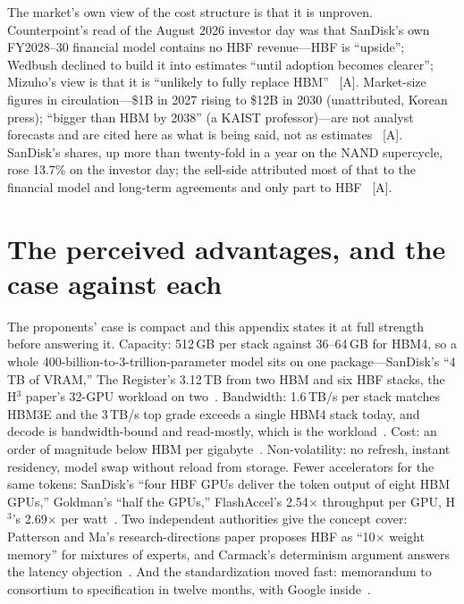 The market's own view of the cost structure is that it is unproven. Counterpoint's read of the August 2026 investor day was that SanDisk's own FY2028--30 financial model contains no HBF revenue---HBF is ``upside''; Wedbush declined to build it into estimates ``until adoption becomes clearer''; Mizuho's view is that it is ``unlikely to fully replace HBM''~\cite{hbf-counterpoint,hbf-tapeout} [A]. Market-size figures in circulation---\$1B in 2027 rising to \$12B in 2030 (unattributed, Korean press); ``bigger than HBM by 2038'' (a KAIST professor)---are not analyst forecasts and are cited here as what is being said, not as estimates~\cite{hbf-koreaherald,hbf-kaist} [A]. SanDisk's shares, up more than twenty-fold in a year on the NAND supercycle, rose 13.7\% on the investor day; the sell-side attributed most of that to the financial model and long-term agreements and only part to HBF~\cite{hbf-tapeout,hbf-counterpoint} [A].

\section{The perceived advantages, and the case against each}

The proponents' case is compact and this appendix states it at full strength before answering it. Capacity: 512\,GB per stack against 36--64\,GB for HBM4, so a whole 400-billion-to-3-trillion-parameter model sits on one package---SanDisk's ``4\,TB of VRAM,'' The Register's 3.12\,TB from two HBM and six HBF stacks, the H$^3$ paper's 32-GPU workload on two~\cite{hbf-toms-2025,hbf-register,hbf-h3}. Bandwidth: 1.6\,TB/s per stack matches HBM3E and the 3\,TB/s top grade exceeds a single HBM4 stack today, and decode is bandwidth-bound and read-mostly, which is the workload~\cite{hbf-spec,hbf-toms-spec}. Cost: an order of magnitude below HBM per gigabyte~\cite{hbf-analysis}. Non-volatility: no refresh, instant residency, model swap without reload from storage. Fewer accelerators for the same tokens: SanDisk's ``four HBF GPUs deliver the token output of eight HBM GPUs,'' Goldman's ``half the GPUs,'' FlashAccel's 2.54$\times$ throughput per GPU, H$^3$'s 2.69$\times$ per watt~\cite{hbf-investorday,hbf-tapeout,hbf-flashaccel,hbf-h3}. Two independent authorities give the concept cover: Patterson and Ma's research-directions paper proposes HBF as ``10$\times$ weight memory'' for mixtures of experts, and Carmack's determinism argument answers the latency objection~\cite{hbf-ma-patterson,hbf-analysis}. And the standardization moved fast: memorandum to consortium to specification in twelve months, with Google inside~\cite{hbf-ocp}.

